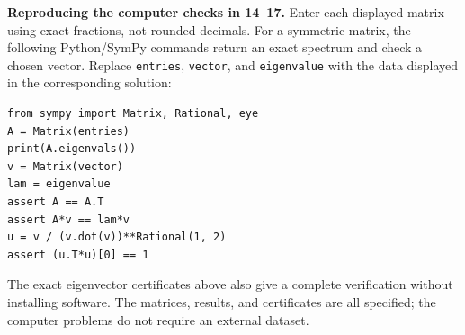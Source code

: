 \textbf{Reproducing the computer checks in 14--17.}
Enter each displayed matrix using exact fractions, not rounded decimals.
For a symmetric matrix, the following Python/SymPy commands return an exact
spectrum and check a chosen vector. Replace \texttt{entries}, \texttt{vector},
and \texttt{eigenvalue} with the data displayed in the corresponding solution:
\begin{verbatim}
from sympy import Matrix, Rational, eye
A = Matrix(entries)
print(A.eigenvals())
v = Matrix(vector)
lam = eigenvalue
assert A == A.T
assert A*v == lam*v
u = v / (v.dot(v))**Rational(1, 2)
assert (u.T*u)[0] == 1
\end{verbatim}
The exact eigenvector certificates above also give a complete verification
without installing software. The matrices, results, and certificates are all
specified; the computer problems do not require an external dataset.
